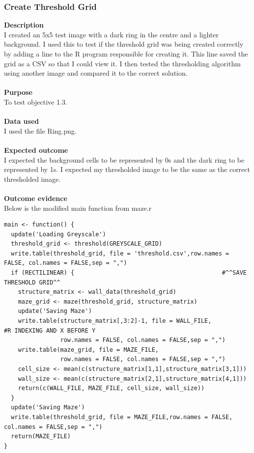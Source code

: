 \documentclass[titlepage]{article}
\begin{document}
\subsubsection{Create Threshold Grid}
\textbf{Description}\\
I created an 5x5 test image with a dark ring in the centre and a lighter background. I used this to test if the threshold grid was being created correctly by adding a line to the R program responsible for creating it. This line saved the grid as a CSV so that I could view it. I then tested the thresholding algorithm using another image and compared it to the correct solution.\\\\
\textbf{Purpose}\\
To test objective 1.3.\\\\
\textbf{Data used} \\
I used the file Ring.png.\\\\
\textbf{Expected outcome}\\
I expected the background cells to be represented by 0s and the dark ring to be represented by 1s. I expected my thresholded image to be the same as the correct thresholded image. \\\\
\textbf{Outcome evidence}\\
Below is the modified main function from maze.r
\begin{changemargin}{-1in}{-1in} 
\begin{verbatim}
main <- function() {
  update('Loading Greyscale')
  threshold_grid <- threshold(GREYSCALE_GRID)
  write.table(threshold_grid, file = 'threshold.csv',row.names = FALSE, col.names = FALSE,sep = ",")
  if (RECTILINEAR) {                                          #^^SAVE THRESHOLD GRID^^
    structure_matrix <- wall_data(threshold_grid)
    maze_grid <- maze(threshold_grid, structure_matrix)
    update('Saving Maze')
    write.table(structure_matrix[,3:2]-1, file = WALL_FILE,                     #R INDEXING AND X BEFORE Y
                row.names = FALSE, col.names = FALSE,sep = ",")
    write.table(maze_grid, file = MAZE_FILE,
                row.names = FALSE, col.names = FALSE,sep = ",")
    cell_size <- mean(c(structure_matrix[1,1],structure_matrix[3,1]))
    wall_size <- mean(c(structure_matrix[2,1],structure_matrix[4,1]))
    return(c(WALL_FILE, MAZE_FILE, cell_size, wall_size))
  }
  update('Saving Maze')
  write.table(threshold_grid, file = MAZE_FILE,row.names = FALSE, col.names = FALSE,sep = ",")
  return(MAZE_FILE)
}
\end{verbatim}
\end{changemargin} 
\end{document}
